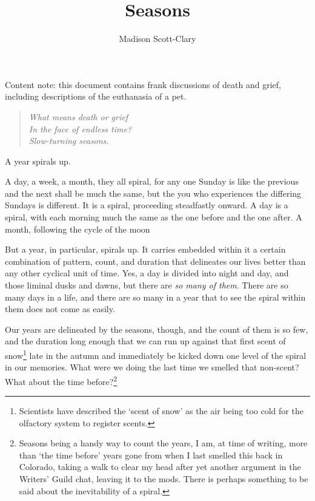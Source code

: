 \documentclass[12pt,oneside]{memoir}
\title{Seasons}
\author{Madison Scott-Clary}
\begin{document}
\maketitle

\begin{center}
  \footnotesize Content note: this document contains frank discussions of death and grief, including descriptions of the euthanasia of a pet.\normalsize
\end{center}

\vskip1cm

\begin{verse}
\centering
  \emph{What means death or grief} \\
  \emph{In the face of endless time?} \\
  \emph{Slow-turning seasons.}
\end{verse}

A year spirals up.

A day, a week, a month, they all spiral, for any one Sunday is like the previous and the next shall be much the same, but the you who experiences the differing Sundays is different. It is a spiral, proceeding steadfastly onward. A day is a spiral, with each morning much the same as the one before and the one after. A month, following the cycle of the moon

But a year, in particular, spirals up. It carries embedded within it a certain combination of pattern, count, and duration that delineates our lives better than any other cyclical unit of time. Yes, a day is divided into night and day, and those liminal dusks and dawns, but there are \emph{so many of them}. There are so many days in a life, and there are so many in a year that to see the spiral within them does not come as easily.

Our years are delineated by the seasons, though, and the count of them is so few, and the duration long enough that we can run up against that first scent of snow\footnote{Scientists have described the `scent of snow' as the air being too cold for the olfactory system to register scents.} late in the autumn and immediately be kicked down one level of the spiral in our memories. What were we doing the last time we smelled that non-scent? What about the time before?\footnote{Seasons being a handy way to count the years, I am, at time of writing, more than `the time before' years gone from when I last smelled this back in Colorado, taking a walk to clear my head after yet another argument in the Writers' Guild chat, leaving it to the mods. There is perhaps something to be said about the inevitability of a spiral.}
\end{document}
